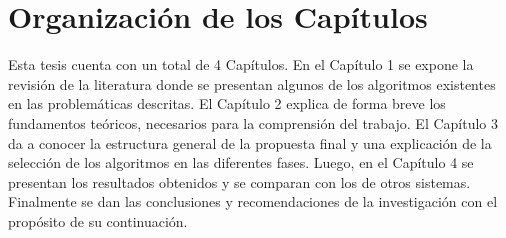 \section*{Organización de los Capítulos}

Esta tesis cuenta con un total de 4 Capítulos. En el Capítulo 1 se expone la revisión de la literatura donde se presentan algunos de los algoritmos existentes en las problemáticas descritas. El Capítulo 2 explica de forma breve los fundamentos teóricos, necesarios para la comprensión del trabajo. El Capítulo 3 da a conocer la estructura general de la propuesta final y una explicación de la selección de los algoritmos en las diferentes fases. Luego, en el Capítulo 4 se presentan los resultados obtenidos y se comparan con los de otros sistemas. Finalmente se dan las conclusiones y recomendaciones de la investigación con el propósito de su continuación.
